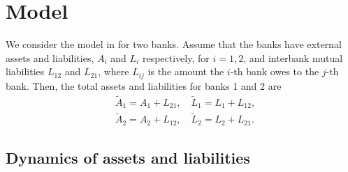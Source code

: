 \section{Model}

We consider %
the model in \cite{Lipton2015} %
for two banks. Assume that the banks have external assets and liabilities, $A_i$ and $L_i$ respectively, for $i = 1, 2$, and interbank mutual liabilities $L_{12}$ and $L_{21}$, where $L_{ij}$ is the amount the $i$-th bank owes to the $j$-th bank. Then, the total assets and liabilities for banks 1 and 2 are
\begin{equation}
	\begin{aligned}
		& \tilde{A}_1 = A_1 + L_{21}, \quad \tilde{L}_1 = L_1 + L_{12}, \\
		& \tilde{A}_2 = A_2 + L_{12}, \quad \tilde{L}_2 = L_2 + L_{21}.
	\end{aligned}
\end{equation}

\subsection{Dynamics of assets and liabilities}

